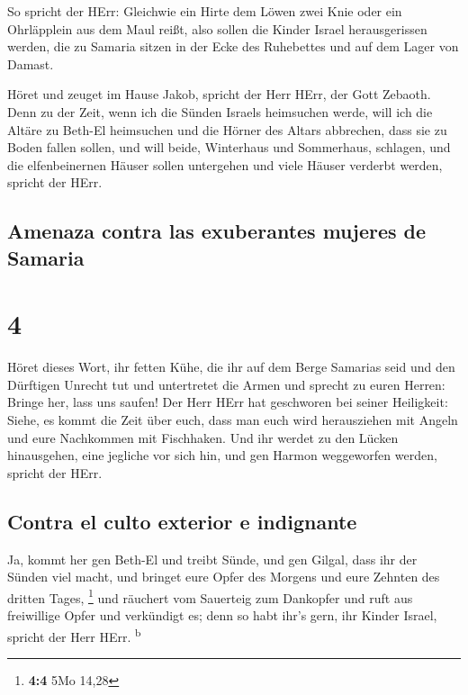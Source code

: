  So spricht der HErr: Gleichwie ein Hirte dem Löwen zwei
Knie oder ein Ohrläpplein aus dem Maul reißt, also sollen die Kinder
Israel herausgerissen werden, die zu Samaria sitzen in der Ecke des
Ruhebettes und auf dem Lager von Damast.

 Höret und zeuget im Hause Jakob, spricht der Herr HErr,
der Gott Zebaoth.  Denn zu der Zeit, wenn ich die Sünden
Israels heimsuchen werde, will ich die Altäre zu Beth-El heimsuchen und
die Hörner des Altars abbrechen, dass sie zu Boden fallen sollen,
 und will beide, Winterhaus und Sommerhaus, schlagen, und
die elfenbeinernen Häuser sollen untergehen und viele Häuser verderbt
werden, spricht der HErr.

\hypertarget{amenaza-contra-las-exuberantes-mujeres-de-samaria}{%
\subsection{Amenaza contra las exuberantes mujeres de
Samaria}\label{amenaza-contra-las-exuberantes-mujeres-de-samaria}}

\hypertarget{section-3}{%
\section{4}\label{section-3}}

 Höret dieses Wort, ihr fetten Kühe, die ihr auf dem Berge
Samarias seid und den Dürftigen Unrecht tut und untertretet die Armen
und sprecht zu euren Herren: Bringe her, lass uns saufen! 
Der Herr HErr hat geschworen bei seiner Heiligkeit: Siehe, es kommt die
Zeit über euch, dass man euch wird herausziehen mit Angeln und eure
Nachkommen mit Fischhaken.  Und ihr werdet zu den Lücken
hinausgehen, eine jegliche vor sich hin, und gen Harmon weggeworfen
werden, spricht der HErr.

\hypertarget{contra-el-culto-exterior-e-indignante}{%
\subsection{Contra el culto exterior e
indignante}\label{contra-el-culto-exterior-e-indignante}}

 Ja, kommt her gen Beth-El und treibt Sünde, und gen
Gilgal, dass ihr der Sünden viel macht, und bringet eure Opfer des
Morgens und eure Zehnten des dritten Tages, \footnote{\textbf{4:4} 5Mo
  14,28}  und räuchert vom Sauerteig zum Dankopfer und
ruft aus freiwillige Opfer und verkündigt es; denn so habt ihr's gern,
ihr Kinder Israel, spricht der Herr HErr. \textsuperscript{b}

